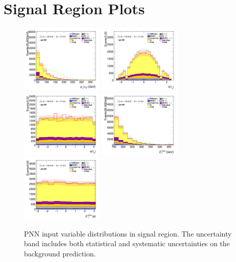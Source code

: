 	\section{\taujets Signal Region Plots}\label{sec:taujet-sr-plots}
		\clearpage
		\begin{figure}[!htp]
			\begin{center}    
			\includegraphics[width=0.35\textwidth]{chapters/chapter6_HPlus/images/taujets/tau_0_pt_SR_TAUJET.png}
			\includegraphics[width=0.35\textwidth]{chapters/chapter6_HPlus/images/taujets/tau_0_eta_SR_TAUJET.png} \\
			\includegraphics[width=0.35\textwidth]{chapters/chapter6_HPlus/images/taujets/tau_0_phi_SR_TAUJET.png}
			\includegraphics[width=0.35\textwidth]{chapters/chapter6_HPlus/images/taujets/met_et_SR_TAUJET.png} \\
			\includegraphics[width=0.35\textwidth]{chapters/chapter6_HPlus/images/taujets/met_phi_SR_TAUJET.png} 
			\end{center}
			\caption{
			PNN input variable distributions in \taujets signal region. The uncertainty band includes both statistical and systematic uncertainties on the background prediction. 
			}
			\label{fig:sr-taujets-1}
		\end{figure}

